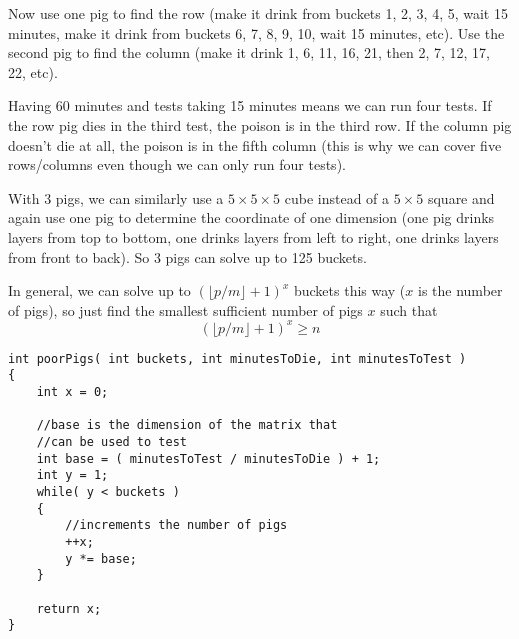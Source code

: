 Now use one pig to find the row (make it drink from buckets 1, 2, 3, 4, 5, wait 15 minutes, make it drink from buckets 6, 7, 8, 9, 10, wait 15 minutes, etc). Use the second pig to find the column (make it drink 1, 6, 11, 16, 21, then 2, 7, 12, 17, 22, etc).

Having 60 minutes and tests taking 15 minutes means we can run four tests. If the row pig dies in the third test, the poison is in the third row. If the column pig doesn't die at all, the poison is in the fifth column (this is why we can cover five rows/columns even though we can only run four tests).

With 3 pigs, we can similarly use a $5\times 5\times 5$ cube instead of a $5\times 5$ square and again use one pig to determine the coordinate of one dimension (one pig drinks layers from top to bottom, one drinks layers from left to right, one drinks layers from front to back). So 3 pigs can solve up to 125 buckets.

In general, we can solve up to $(\lfloor p / m\rfloor + 1)^x$ buckets this way ($x$ is the number of pigs), so just find the smallest sufficient number of pigs $x$ such that
\[
(\lfloor p / m\rfloor + 1)^x \geq n
\]

\setcounter{lstlisting}{0}
\begin{lstlisting}[style=customc, caption={Matrix}]
int poorPigs( int buckets, int minutesToDie, int minutesToTest )
{
    int x = 0;

    //base is the dimension of the matrix that
    //can be used to test
    int base = ( minutesToTest / minutesToDie ) + 1;
    int y = 1;
    while( y < buckets )
    {
        //increments the number of pigs
        ++x;
        y *= base;
    }

    return x;
}
\end{lstlisting}